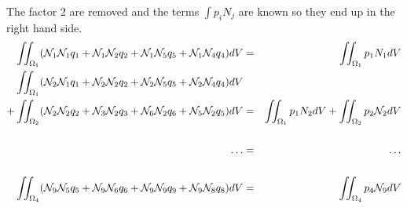 The factor 2 are removed and the terms $\int p_i N_j $ are known so they end up in the right hand side.
\begin{eqnarray}
 \iint_{\Omega_1} (\bN_1 \bN_1 q_1 + \bN_1 \bN_2 q_2 + \bN_1 \bN_5 q_5 + \bN_1 \bN_4 q_4) dV 
&=& \iint_{\Omega_1} p_1 N_1 dV \nn\\
 \iint_{\Omega_1} (\bN_2 \bN_1 q_1 + \bN_2 \bN_2 q_2 + \bN_2 \bN_5 q_5 + \bN_2 \bN_4 q_4) dV \nn\\
+\iint_{\Omega_2} (\bN_2 \bN_2 q_2 + \bN_3 \bN_2 q_3 + \bN_6 \bN_2 q_6 + \bN_5 \bN_2 q_5) dV 
&=& \iint_{\Omega_1} p_1N_2 dV + \iint_{\Omega_2}  p_2 \bN_2 dV \nn\\
\nn\\
\dots &=& \dots \nn\\
\nn\\
 \iint_{\Omega_4} (\bN_9\bN_5 q_5 + \bN_9\bN_6q_6 + \bN_9\bN_9q_9 + \bN_9\bN_8q_8) dV &=&  \iint_{\Omega_4} p_4 \bN_9 dV 
\end{eqnarray}

